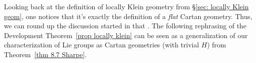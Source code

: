 


Looking back at the definition of locally Klein geometry from \S\ref{sec: locally Klein geom}, one notices that it's exactly the definition of a \emph{flat} Cartan geometry. Thus, we can round up the discussion started in that \sect. The following rephrasing of the Development Theorem~\ref{prop locally klein} can be seen as a generalization of our characterization of Lie groups as Cartan geometries (with trivial $H$) from Theorem~\ref{thm 8.7 Sharpe}.

